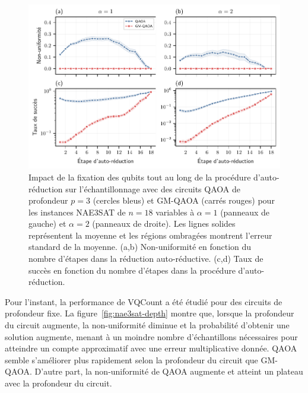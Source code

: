 \begin{figure}[H]
    \centering
    \includegraphics[width=1\textwidth]{figures/nae3sat-self-reduction-step.pdf}
    \caption[Impact de la procédure d'auto-réduction sur la non-uniformité pour \#NAE3SAT]{Impact de la fixation des qubits tout au long de la procédure d'auto-réduction sur l'échantillonnage avec des circuits QAOA de profondeur $p=3$ (cercles bleus) et GM-QAOA (carrés rouges) pour les instances NAE3SAT de $n=18$ variables à $\alpha=1$ (panneaux de gauche) et $\alpha=2$ (panneaux de droite). Les lignes solides représentent la moyenne et les régions ombragées montrent l'erreur standard de la moyenne. (a,b) Non-uniformité en fonction du nombre d'étapes dans la réduction auto-réductive. (c,d) Taux de succès en fonction du nombre d'étapes dans la procédure d'auto-réduction.}
    \label{fig:nae3sat-jvv-steps}
\end{figure}

Pour l'instant, la performance de VQCount a été étudié pour des circuits de profondeur fixe. La figure~\ref{fig:nae3sat-depth} montre que, lorsque la profondeur du circuit augmente, la non-uniformité diminue et la probabilité d'obtenir une solution augmente, menant à un moindre nombre d'échantillons nécessaires pour atteindre un compte approximatif avec une erreur multiplicative donnée. QAOA semble s'améliorer plus rapidement selon la profondeur du circuit que GM-QAOA. D'autre part, la non-uniformité de QAOA augmente et atteint un plateau avec la profondeur du circuit.

